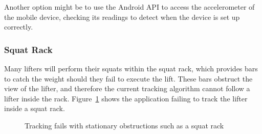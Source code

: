 Another option might be to use the Android API to access the accelerometer of the mobile device, checking its readings to detect when the device is set up correctly.

\subsubsection{Squat Rack}

Many lifters will perform their squats within the squat rack, which provides bars to catch the weight should they fail to execute the lift. These bars obstruct the view of the lifter, and therefore the current tracking algorithm cannot follow a lifter inside the rack. Figure~\ref{fig:squatrack} shows the application failing to track the lifter inside a squat rack.

\begin{figure}[H]
    \centering
\caption{Tracking fails with stationary obstructions such as a squat rack}
\label{fig:squatrack}
\end{figure}


